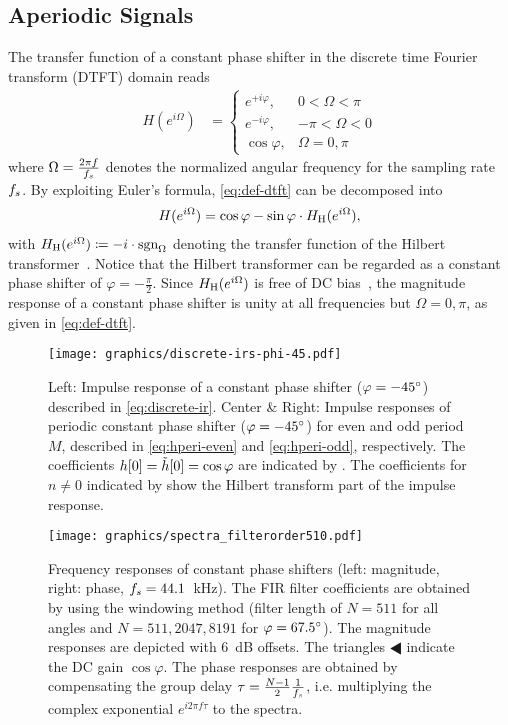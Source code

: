 \subsection[Aperiodic Signals]{Aperiodic Signals}
\label{sec:aperiodic-signals}
%
The transfer function of a constant phase shifter
in the discrete time Fourier transform (DTFT) domain reads
\begin{align}
H(e^{i\Omega}) &=
\begin{cases}
e^{+i\varphi}, & 0 < \Omega < \pi\\
e^{-i\varphi}, & -\pi < \Omega < 0\\
\cos\varphi, & \Omega = 0, \pi
\end{cases}
\label{eq:def-dtft}
\end{align}
where $\Omega = \frac{2\pi f}{{f}_{s}}$ denotes the normalized angular frequency
for the sampling rate ${f}_{s}$.
By exploiting Euler's formula, \eqref{eq:def-dtft} can be decomposed into
\begin{align}
H(e^{i\Omega})
= \cos\varphi
- \sin\varphi\cdot\Hh(e^{i\Omega}),
\label{eq:decomp-dtft}
\end{align}
with
$H_{\mathrm{H}}(e^{i\Omega})\coloneqq-i\cdot\text{sgn}_{\Omega}$ denoting
the transfer function of the Hilbert transformer~\cite{hahn1996hilbert}.
Notice that the Hilbert transformer can be regarded
as a constant phase shifter of $\varphi=-\tfrac{\pi}{2}$.
Since $H_{\mathrm{H}}(e^{i\Omega})$ is free of DC bias~\cite[Sec.~4.2]{hahn1996hilbert},
the magnitude response of a constant phase shifter
is unity at all frequencies but $\Omega=0, \pi$,
as given in \eqref{eq:def-dtft}.
%
\begin{figure*}[t]
\centering
\texttt{[image: graphics/discrete-irs-phi-45.pdf]}
\caption{Left: Impulse response of a constant phase shifter ($\varphi=-45\degree$)
described in \eqref{eq:discrete-ir}.
Center \& Right: Impulse responses of periodic constant phase shifter ($\varphi=-45\degree$)
for even and odd period $M$, described in \eqref{eq:hperi-even} and \eqref{eq:hperi-odd}, respectively.
The coefficients $h[0] = \tilde{h}[0] = \cos\varphi$ are indicated by .
The coefficients for $n\neq 0$ indicated by  show
the Hilbert transform part of the impulse response.}
\label{fig:discrete-ir}
\end{figure*}
%
\begin{figure*}[]
\centering
\texttt{[image: graphics/spectra\_filterorder510.pdf]}
\caption{Frequency responses of constant phase shifters
(left: magnitude, right: phase, ${f}_{s}=44.1$~kHz).
The FIR filter coefficients are obtained by using the windowing method
(filter length of $N=511$ for all angles and $N=511, 2047, 8191$ for $\varphi=67.5\degree$).
The magnitude responses are depicted with $6$~dB offsets.
The triangles $\LHD$ indicate the DC gain $\cos\varphi$.
The phase responses are obtained by compensating the group delay
$\tau = \frac{N-1}{2}\frac{1}{{f}_{s}}$, i.e. multiplying the complex exponential
$e^{i2\pi f\tau}$ to the spectra.}
\label{fig:spectra}
\end{figure*}
